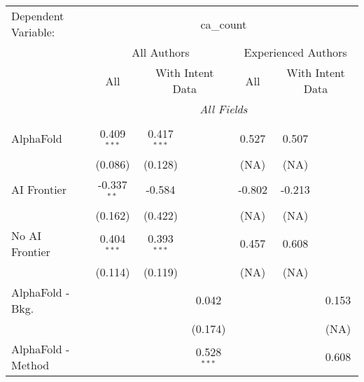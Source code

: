 \begingroup
\centering
\begin{tabular}{lcccccc}
   \tabularnewline \midrule \midrule
   Dependent Variable: & \multicolumn{6}{c}{ca\_count}\\
 & \multicolumn{3}{c}{All Authors} & \multicolumn{3}{c}{Experienced Authors} \\
\cmidrule(lr){2-4} \cmidrule(lr){5-7}
 & \multicolumn{1}{c}{All} & \multicolumn{2}{c}{With Intent Data} & \multicolumn{1}{c}{All} & \multicolumn{2}{c}{With Intent Data} \\
\cmidrule(lr){2-2} \cmidrule(lr){3-4} \cmidrule(lr){5-5} \cmidrule(lr){6-7}
 & \multicolumn{6}{c}{\textit{All Fields}} \\ \\
   AlphaFold                                                                  & 0.409$^{***}$ & 0.417$^{***}$ &               & 0.527                  & 0.507                  &   \\   
                                                                              & (0.086)       & (0.128)       &               & (NA)                   & (NA)                   &   \\   
   AI Frontier                                                                & -0.337$^{**}$ & -0.584        &               & -0.802                 & -0.213                 &   \\   
                                                                              & (0.162)       & (0.422)       &               & (NA)                   & (NA)                   &   \\   
   No AI Frontier                                                             & 0.404$^{***}$ & 0.393$^{***}$ &               & 0.457                  & 0.608                  &   \\   
                                                                              & (0.114)       & (0.119)       &               & (NA)                   & (NA)                   &   \\   
   AlphaFold - Bkg.                                                           &               &               & 0.042         &                        &                        & 0.153\\   
                                                                              &               &               & (0.174)       &                        &                        & (NA)\\   
   AlphaFold - Method                                                         &               &               & 0.528$^{***}$ &                        &                        & 0.608\\   

\end{tabular}
